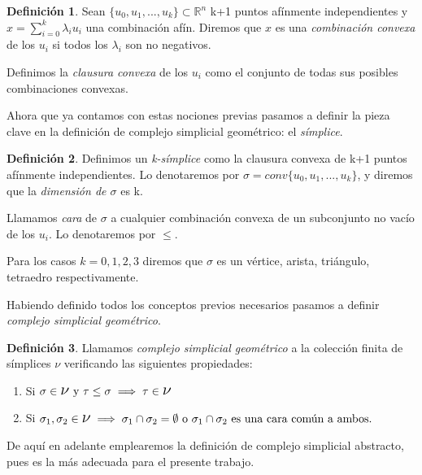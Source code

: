 \documentclass[12pt, a4paper]{article}
\numberwithin{equation}{section}
\theoremstyle{definition}
\newtheorem{defi}{Definición}
\theoremstyle{remark}
\theoremstyle{plain}
\begin{document}
	\begin{defi}
		Sean $\{u_{0},u_{1},...,u_{k}\}\subset\mathbb{R}^{n}$ k+1 
		puntos afínmente independientes y $x=\sum_{i=0}^{k}
		\lambda_{i}u_{i}$ una combinación afín. Diremos que $x$ es una
		\textit{combinación convexa} de los $u_{i}$ si todos los 
		$\lambda_{i}$ son no negativos.

		Definimos la \textit{clausura convexa} de los $u_{i}$ como el
		conjunto de todas sus posibles combinaciones convexas.
	\end{defi}

	Ahora que ya contamos con estas nociones previas pasamos a definir la 
	pieza clave en la definición de complejo simplicial geométrico: el 
	\emph{símplice}.

	\begin{defi}
		Definimos un \textit{k-símplice} como la clausura convexa de 
		k+1 puntos afínmente independientes. Lo denotaremos por 
		$\sigma=conv\{u_{0},u_{1},...,u_{k}\}$, y diremos que la 
		\textit{dimensión de $\sigma$} es k.

		Llamamos \textit{cara} de $\sigma$ a cualquier combinación 
		convexa de un subconjunto no vacío de los $u_{i}$. Lo 
		denotaremos por $\leq$.

		Para los casos $k=0,1,2,3$ diremos que $\sigma$ es un vértice,
		arista, triángulo, tetraedro respectivamente.
	\end{defi}

	Habiendo definido todos los conceptos previos necesarios pasamos a 
	definir \emph{complejo simplicial geométrico}.

	\begin{defi}
		Llamamos \textit{complejo simplicial geométrico} a la 
		colección finita de símplices {\Large $\nu$} verificando las
		siguientes propiedades:
		\begin{enumerate}
			\item Si $\sigma\in \text{{\Large $\nu$} y }
				\tau \leq \sigma \implies \tau \in 
				\text{{\Large $\nu$}}$
			\item Si $\sigma_{1},\sigma_{2} \in 
				\text{{\Large $\nu$}} \implies 
				\sigma_{1}\cap\sigma_{2}=\emptyset \text{ o }
				\sigma_{1}\cap\sigma_{2} \text{ es una cara 
				común a ambos.}$
		\end{enumerate}
	\end{defi}
	
	De aquí en adelante emplearemos la definición de complejo simplicial 
	abstracto, pues es la más adecuada para el presente trabajo.
\end{document}
